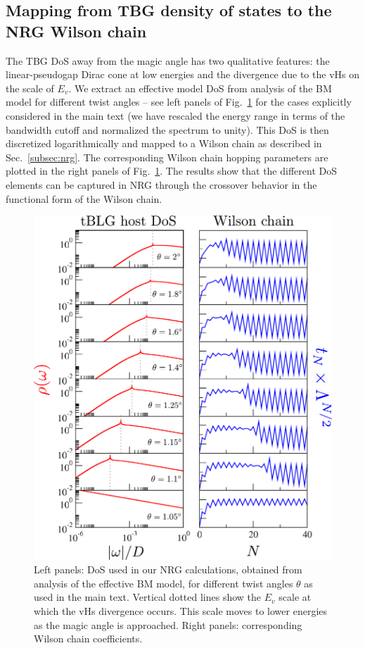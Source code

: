 


\newpage
\subsection{Mapping from TBG density of states to the NRG Wilson chain}
\label{app:KondoB}
The TBG DoS away from the magic angle has two qualitative features: the linear-pseudogap Dirac cone at low energies and the divergence due to the vHs on the scale of $E_v$. We extract an effective model DoS from analysis of the BM model for different twist angles -- see left panels of Fig.~\ref{fig:wc} for the cases explicitly considered in the main text (we have rescaled the energy range in terms of the bandwidth cutoff and normalized the spectrum to unity). This DoS is then discretized logarithmically and mapped to a Wilson chain \cite{bulla2008numerical} as described in Sec.~\ref{subsec:nrg}. The corresponding Wilson chain hopping parameters are plotted in the right panels of Fig.~\ref{fig:wc}. The results show that the different DoS elements can be captured in NRG through the crossover behavior in the functional form of the Wilson chain.
\begin{figure}[H]
	\centering
	\includegraphics[width = 0.8\linewidth]{figures/chapter2/DoS_wc_labels.pdf}
	\caption{
		  Left panels: DoS used in our NRG calculations, obtained from analysis of the effective BM model, for different twist angles $\theta$ as used in the main text. Vertical dotted lines show the $E_v$ scale at which the vHs divergence occurs. This scale moves to lower energies as the magic angle is approached. Right panels: corresponding Wilson chain coefficients.}
	\label{fig:wc}
\end{figure}



